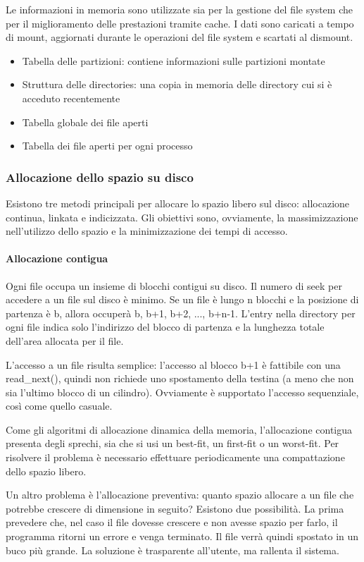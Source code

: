 \documentclass[a4paper]{article}
\begin{document}
Le informazioni in memoria sono utilizzate sia per la gestione del file system che per il miglioramento delle prestazioni tramite cache. I dati sono caricati a tempo di mount, aggiornati durante le operazioni del file system e scartati al dismount.
\begin{itemize}
    \item Tabella delle partizioni: contiene informazioni sulle partizioni montate
    \item Struttura delle directories: una copia in memoria delle directory cui si è acceduto recentemente
    \item Tabella globale dei file aperti
    \item Tabella dei file aperti per ogni processo
\end{itemize}

\subsubsection{Allocazione dello spazio su disco}
Esistono tre metodi principali per allocare lo spazio libero sul disco: allocazione continua, linkata e indicizzata. Gli obiettivi sono, ovviamente, la massimizzazione nell'utilizzo dello spazio e la minimizzazione dei tempi di accesso.

\paragraph{Allocazione contigua}
Ogni file occupa un insieme di blocchi contigui su disco. Il numero di seek per accedere a un file sul disco è minimo. Se un file è lungo n blocchi e la posizione di partenza è b, allora occuperà b, b+1, b+2, ..., b+n-1. L'entry nella directory per ogni file indica solo l'indirizzo del blocco di partenza e la lunghezza totale dell'area allocata per il file.

L'accesso a un file risulta semplice: l'accesso al blocco b+1 è fattibile con una read\_next(), quindi non richiede uno spostamento della testina (a meno che non sia l'ultimo blocco di un cilindro). Ovviamente è supportato l'accesso sequenziale, così come quello casuale.

Come gli algoritmi di allocazione dinamica della memoria, l'allocazione contigua presenta degli sprechi, sia che si usi un best-fit, un first-fit o un worst-fit. Per risolvere il problema è necessario effettuare periodicamente una compattazione dello spazio libero.

Un altro problema è l'allocazione preventiva: quanto spazio allocare a un file che potrebbe crescere di dimensione in seguito? Esistono due possibilità. La prima prevedere che, nel caso il file dovesse crescere e non avesse spazio per farlo, il programma ritorni un errore e venga terminato. Il file verrà quindi spostato in un buco più grande. La soluzione è trasparente all'utente, ma rallenta il sistema.
\end{document}
